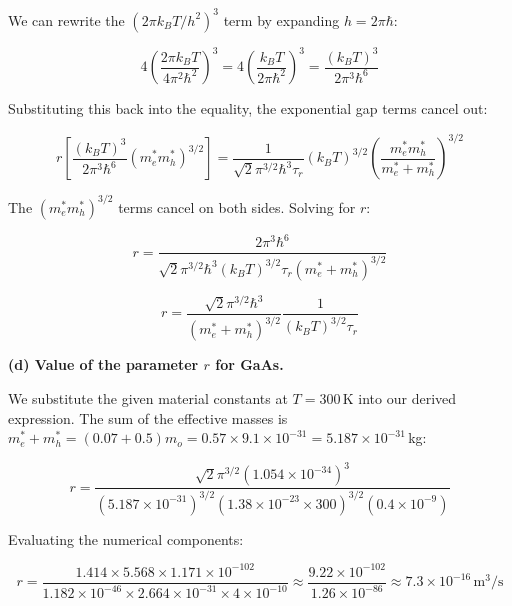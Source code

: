 We can rewrite the $(2\pi k_B T / h^2)^3$ term by expanding $h = 2\pi\hbar$:

\begin{equation*}
  4 \left( \frac{2\pi k_B T}{4\pi^2\hbar^2} \right)^3 = 4 \left( \frac{k_B T}{2\pi\hbar^2} \right)^3 = \frac{(k_B T)^3}{2 \pi^3 \hbar^6}
\end{equation*}

Substituting this back into the equality, the exponential gap terms cancel out:

\begin{equation*}
  r \left[ \frac{(k_B T)^3}{2 \pi^3 \hbar^6} (m_e^* m_h^*)^{3/2} \right] = \frac{1}{\sqrt{2} \pi^{3/2} \hbar^3 \tau_r} (k_B T)^{3/2} \left( \frac{m_e^* m_h^*}{m_e^* + m_h^*} \right)^{3/2}
\end{equation*}

The $(m_e^* m_h^*)^{3/2}$ terms cancel on both sides. Solving for $r$:

\begin{equation*}
  r = \frac{2 \pi^3 \hbar^6}{\sqrt{2} \pi^{3/2} \hbar^3 (k_B T)^{3/2} \tau_r (m_e^* + m_h^*)^{3/2}}
\end{equation*}

\begin{equation*}
  \boxed{r = \frac{\sqrt{2}\pi^{3/2}\hbar^3}{(m_e^* + m_h^*)^{3/2}} \frac{1}{(k_B T)^{3/2}\tau_r}}
\end{equation*}

\textbf{(d) Value of the parameter $r$ for GaAs.}

We substitute the given material constants at $T = 300$\,K into our derived expression. The sum of the effective masses is $m_e^* + m_h^* = (0.07 + 0.5)m_o = 0.57 \times 9.1 \times 10^{-31} = 5.187 \times 10^{-31}$\,kg:

\begin{equation*}
  r = \frac{\sqrt{2} \pi^{3/2} (1.054 \times 10^{-34})^3}{(5.187 \times 10^{-31})^{3/2} (1.38 \times 10^{-23} \times 300)^{3/2} (0.4 \times 10^{-9})}
\end{equation*}

Evaluating the numerical components:

\begin{equation*}
  r = \frac{1.414 \times 5.568 \times 1.171 \times 10^{-102}}{1.182 \times 10^{-46} \times 2.664 \times 10^{-31} \times 4 \times 10^{-10}} \approx \frac{9.22 \times 10^{-102}}{1.26 \times 10^{-86}} \approx 7.3 \times 10^{-16}\,\text{m}^3/\text{s}
\end{equation*}


